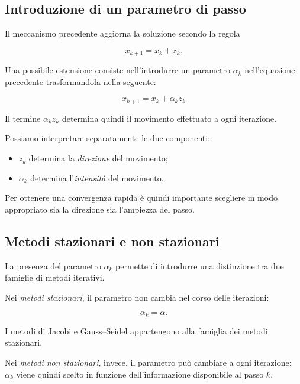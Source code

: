 \subsection{Introduzione di un parametro di passo}

Il meccanismo precedente aggiorna la soluzione secondo la regola

\begin{equation*}
    x_{k+1}=x_k+z_k.
\end{equation*}

Una possibile estensione consiste nell'introdurre un parametro
$\alpha_k$ nell'equazione precedente trasformandola nella seguente:

\begin{equation*}
    x_{k+1}=x_k+\alpha_k z_k
    \label{eq:iter-alpha}
\end{equation*}

Il termine $\alpha_kz_k$ determina quindi il movimento effettuato
a ogni iterazione.

Possiamo interpretare separatamente le due componenti:

\begin{itemize}
    \item $z_k$ determina la \emph{direzione} del movimento;
    \item $\alpha_k$ determina l'\emph{intensità} del movimento.
\end{itemize}

Per ottenere una convergenza rapida è quindi importante scegliere
in modo appropriato sia la direzione sia l'ampiezza del passo.


\subsection{Metodi stazionari e non stazionari}

La presenza del parametro $\alpha_k$ permette di introdurre una
distinzione tra due famiglie di metodi iterativi.

Nei \emph{metodi stazionari}, il parametro non cambia nel corso
delle iterazioni:

\begin{equation*}
    \alpha_k=\alpha.
\end{equation*}

I metodi di Jacobi e Gauss--Seidel appartengono alla famiglia dei
metodi stazionari.

Nei \emph{metodi non stazionari}, invece, il parametro può cambiare
a ogni iterazione: $\alpha_k$ 
viene quindi scelto in funzione dell'informazione disponibile al
passo $k$.

